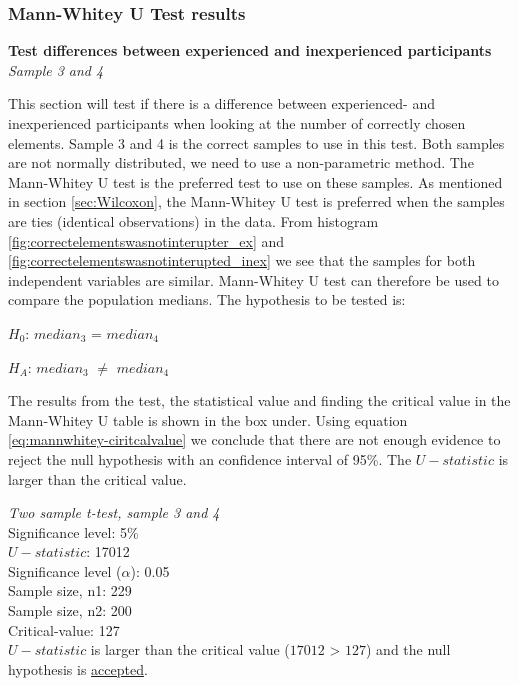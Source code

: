 \subsubsection{Mann-Whitey U Test results}

\textbf{Test differences between experienced and inexperienced participants}\\
\textit{Sample 3 and 4}\newline

This section will test if there is a difference between experienced- and inexperienced participants when looking at the number of correctly chosen elements. Sample 3 and 4 is the correct samples to use in this test. Both samples are not normally distributed, we need to use a non-parametric method. The Mann-Whitey U test is the preferred test to use on these samples. As mentioned in section \ref{sec:Wilcoxon}, the Mann-Whitey U test is preferred when the samples are ties (identical observations) in the data. From histogram \ref{fig:correctelementswasnotinterupter_ex} and \ref{fig:correctelementswasnotinterupted_inex} we see that the samples for both independent variables are similar. Mann-Whitey U test can therefore be used to compare the population medians. The hypothesis to be tested is:\\[0.3cm]

\centerline{$H_{0}$: $median_3$ = $median_4$}
\centerline{$H_{A}$: $median_3$ $\neq$ $median_4$}

The results from the test, the statistical value and finding the critical value in the Mann-Whitey U table is shown in the box under. Using equation \ref{eq:mannwhitey-ciritcalvalue} we conclude that there are not enough evidence to reject the null hypothesis with an confidence interval of 95\%. The $U-statistic$ is larger than the critical value. 

 \begin{center}
	\begin{tcolorbox}[box align=center,width=\textwidth-5cm]
		\centering
		\textit{Two sample t-test, sample 3 and 4}\\
		Significance level: 5\%  \\[0.5cm]
		
		$U-statistic$: 17012 \\
		Significance level ($\alpha$): 0.05 \\
		Sample size, n1:  229\\
		Sample size, n2: 200\\
		Critical-value: 127 \\[0.2cm] %
		
		$U-statistic$ is larger than the critical value ($17012$ > $127$) and the null hypothesis is \underline{accepted}.\\[0.5cm]
	\end{tcolorbox} 
\end{center}

